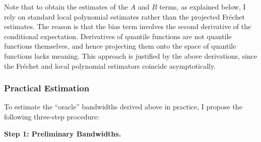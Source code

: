\documentclass[12pt]{article}
\begin{document}
Note that to obtain the estimates of the $A$ and $B$ terms, as explained below, I rely on standard local polynomial estimates rather than the projected Fr\'echet estimates. The reason is that the bias term involves the second derivative of the conditional expectation. Derivatives of quantile functions are not quantile functions themselves, and hence projecting them onto the space of quantile functions lacks meaning. This approach is justified by the above derivations, since the Fr\'echet and local polynomial estimators coincide asymptotically. 

\subsubsection{Practical Estimation} \label{sec_app:bandwidth_practical_estimation}

To estimate the ``oracle'' bandwidths derived above in practice, I propose the following three-step procedure: 


\noindent \textbf{Step 1: Preliminary Bandwidths.}
\end{document}
